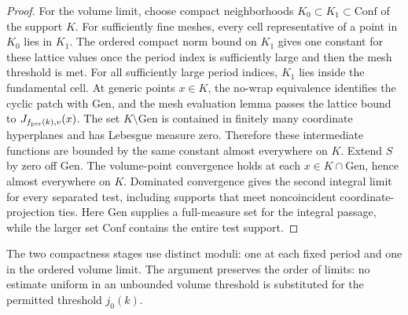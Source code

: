\begin{proof}
For the volume limit, choose compact neighborhoods $K_0\subset K_1\subset
\mathrm{Conf}$ of the support $K$. For sufficiently fine meshes, every cell
representative of a point in $K_0$ lies in $K_1$. The ordered compact norm
bound on $K_1$ gives one constant for these lattice values once the period
index is sufficiently large and then the mesh threshold is met. For all
sufficiently large period indices, $K_1$ lies inside the fundamental cell.
At generic points $x\in K$, the no-wrap equivalence identifies the cyclic
patch with $\mathrm{Gen}$, and the mesh evaluation lemma passes the lattice
bound to $J_{f_{\rm per}(k),v}(x)$. The set $K\setminus\mathrm{Gen}$ is
contained in finitely many coordinate hyperplanes and has Lebesgue measure
zero. Therefore these intermediate functions are bounded by the same constant
almost everywhere on $K$. Extend $S$ by zero off $\mathrm{Gen}$. The
volume-point convergence holds at each $x\in K\cap\mathrm{Gen}$, hence almost
everywhere on $K$. Dominated convergence gives the
second integral limit for every separated test, including supports that meet
noncoincident coordinate-projection ties. Here $\mathrm{Gen}$ supplies a
full-measure set for the integral passage, while the larger set
$\mathrm{Conf}$ contains the entire test support.
\end{proof}

The two compactness stages use distinct moduli: one at each fixed period and
one in the ordered volume limit. The argument preserves the order of limits:
no estimate uniform in an unbounded volume threshold is substituted for the
permitted threshold $j_0(k)$.

